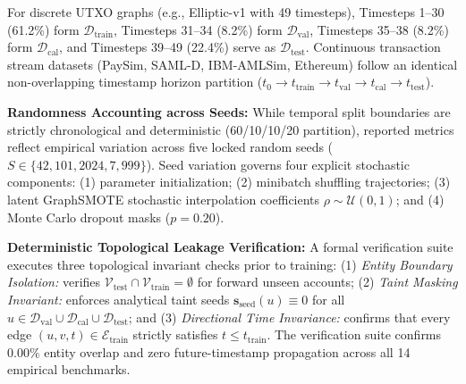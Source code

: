 For discrete UTXO graphs (e.g., Elliptic-v1 with 49 timesteps), Timesteps 1--30 (61.2\%) form $\mathcal{D}_{\text{train}}$, Timesteps 31--34 (8.2\%) form $\mathcal{D}_{\text{val}}$, Timesteps 35--38 (8.2\%) form $\mathcal{D}_{\text{cal}}$, and Timesteps 39--49 (22.4\%) serve as $\mathcal{D}_{\text{test}}$. Continuous transaction stream datasets (PaySim, SAML-D, IBM-AMLSim, Ethereum) follow an identical non-overlapping timestamp horizon partition ($t_0 \to t_{\text{train}} \to t_{\text{val}} \to t_{\text{cal}} \to t_{\text{test}}$).

\textbf{Randomness Accounting across Seeds:} While temporal split boundaries are strictly chronological and deterministic (60/10/10/20 partition), reported metrics reflect empirical variation across five locked random seeds ($S \in \{42, 101, 2024, 7, 999\}$). Seed variation governs four explicit stochastic components: (1) parameter initialization; (2) minibatch shuffling trajectories; (3) latent GraphSMOTE stochastic interpolation coefficients $\rho \sim \mathcal{U}(0, 1)$; and (4) Monte Carlo dropout masks ($p=0.20$).

\textbf{Deterministic Topological Leakage Verification:} A formal verification suite executes three topological invariant checks prior to training: (1) \textit{Entity Boundary Isolation:} verifies $\mathcal{V}_{\text{test}} \cap \mathcal{V}_{\text{train}} = \emptyset$ for forward unseen accounts; (2) \textit{Taint Masking Invariant:} enforces analytical taint seeds $\mathbf{s}_{\text{seed}}(u) \equiv 0$ for all $u \in \mathcal{D}_{\text{val}} \cup \mathcal{D}_{\text{cal}} \cup \mathcal{D}_{\text{test}}$; and (3) \textit{Directional Time Invariance:} confirms that every edge $(u, v, t) \in \mathcal{E}_{\text{train}}$ strictly satisfies $t \le t_{\text{train}}$. The verification suite confirms $0.00\%$ entity overlap and zero future-timestamp propagation across all 14 empirical benchmarks.

